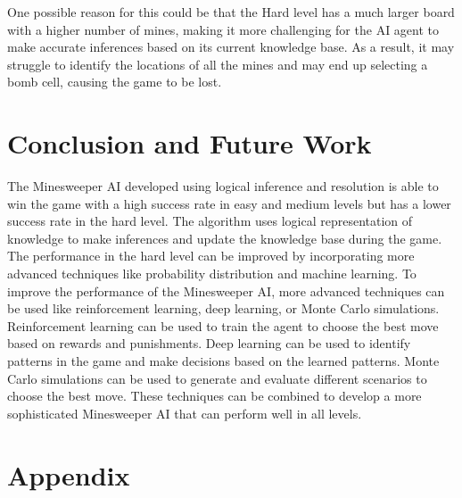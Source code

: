 \documentclass{article} %
\begin{document}
One possible reason for this could be that the Hard level has a much larger board with a higher number of mines, making it more challenging for the AI agent to make accurate inferences based on its current knowledge base. As a result, it may struggle to identify the locations of all the mines and may end up selecting a bomb cell, causing the game to be lost.
\section{Conclusion and Future Work}
The Minesweeper AI developed using logical inference and resolution is able to win the game with a high success rate in easy and medium levels but has a lower success rate in the hard level. The algorithm uses logical representation of knowledge to make inferences and update the knowledge base during the game. The performance in the hard level can be improved by incorporating more advanced techniques like probability distribution and machine learning.
To improve the performance of the Minesweeper AI, more advanced techniques can be used like reinforcement learning, deep learning, or Monte Carlo simulations. Reinforcement learning can be used to train the agent to choose the best move based on rewards and punishments. Deep learning can be used to identify patterns in the game and make decisions based on the learned patterns. Monte Carlo simulations can be used to generate and evaluate different scenarios to choose the best move. These techniques can be combined to develop a more sophisticated Minesweeper AI that can perform well in all levels.

\clearpage
{}%
\renewcommand*{\thepage}{A. \arabic{page}}

\section*{Appendix}
\end{document}
